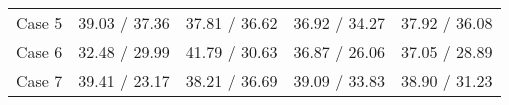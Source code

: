 \begin{table}[t]
{\begin{tabular}{c c c c c}
         Case 5 & 39.03 / 37.36 & 37.81 / 36.62 & 36.92 / 34.27& 37.92 / 36.08\\
         Case 6 & 32.48 / 29.99 & 41.79 / 30.63 &36.87 / 26.06 & 37.05 / 28.89\\
         Case 7 & 39.41 / 23.17 & 38.21 / 36.69 & 39.09 / 33.83& 38.90 / 31.23\\
        \bottomrule
    \end{tabular}%
    }
    \vspace{-0.2cm}
    \label{tab:clip_score}
\end{table}
